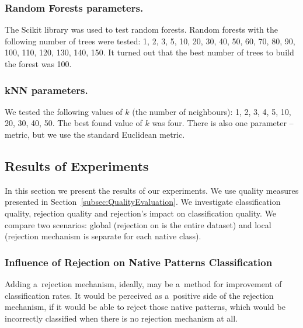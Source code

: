 \documentclass{llncs}
\begin{document}
\subsubsection{Random Forests parameters.}
The Scikit library was used to test random forests. Random forests with the following number of trees were tested: 1, 2, 3, 5, 10, 20, 30, 40, 50, 60, 70, 80, 90, 100, 110, 120, 130, 140, 150. It turned out that the best number of trees to build the forest was 100.

\vspace{-9pt}
\subsubsection{kNN parameters.}
We tested the following values of $k$ (the number of neighbours): 1, 2, 3, 4, 5, 10, 20, 30, 40, 50. The best found value of $k$ was four. There is also one parameter -- metric, but we use the standard Euclidean metric.

\vspace{-9pt}
\subsection{Results of Experiments}
\vspace{-3pt}

In this section we present the results of our experiments. We use quality measures presented in Section~\ref{subsec:QualityEvaluation}. We investigate classification quality, rejection quality and rejection's impact on classification quality. We compare two scenarios: global (rejection on is the entire dataset) and local (rejection mechanism is separate for each native class). 

\vspace{-12pt}
\subsubsection{Influence of Rejection on Native Patterns Classification}
Adding a~rejection mechanism, ideally, may be a~method for improvement of classification rates. It would be perceived as a~positive side of the rejection mechanism, if it would be able to reject those native patterns, which would be incorrectly classified when there is no rejection mechanism at all. 
\end{document}

